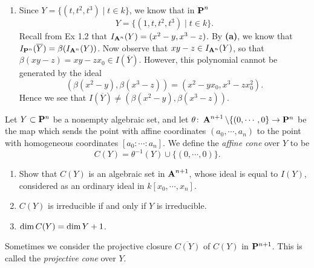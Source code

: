 \documentclass[10pt]{amsart}
\begin{document}
\begin{solution}
\begin{luke}
\begin{enumerate}
            \item Since $Y = \{(t, t^2, t^3) \mid t \in k\}$, we know that in $\pp^n$
            \[
                Y = \{ (1, t, t^2, t^3) \mid t \in k \}.
            \]
            Recall from Ex 1.2 that $I_{\aa^n}(Y) = (x^2 - y, x^3 - z)$. 
            By \textbf{(a)}, we know that $I_{\pp^n}(\overline{Y}) = \beta(I_{\aa^n}(Y))$.
            Now observe that $xy - z \in I_{\aa^n}(Y)$, so that $\beta(xy-z) = xy - zx_0 \in I(\overline{Y})$. 
            However, this polynomial cannot be generated by the ideal 
            \[
                (\beta(x^2 - y), \beta(x^3 - z)) = (x^2 - yx_0, x^3 - zx_0^2).  
            \]
            Hence we see that $I(\overline{Y}) \ne (\beta(x^2 - y), \beta(x^3 - z))$. 

        \end{enumerate}
    \end{luke}
\end{solution}

\begin{exercise}[2.10]
    Let $Y \subset \bbP^n$ be a nonempty algebraic set, and let $\theta\colon
    \aa^{n+1} \setminus \{(0,\cdots,0\} \to \bbP^n$ be the map which sends the
    point with affine coordinates $(a_0, \cdots, a_n)$ to the point with
    homogeneous coordinates $[a_0 :\cdots: a_n]$. We define the \emph{affine cone}
    over $Y$ to be $$C(Y) = \theta^{-1}(Y) \cup \{(0,\cdots, 0)\}.$$ 
    \begin{enumerate}
        \item Show that $C(Y)$ is an algebraic set in $\aa^{n+1}$, whose ideal is equal to $I(Y)$, considered as an ordinary ideal in $k[x_0, \cdots, x_n]$. 
        \item $C(Y)$ is irreducible if and only if $Y$ is irreducible. 
        \item $\Dim C(Y) = \Dim Y +1$.
    \end{enumerate}
    Sometimes we consider the projective closure $\overline{C(Y)}$ of $C(Y)$ in
    $\bbP^{n+1}$. This is called the \emph{projective cone} over $Y$.
\end{exercise}
\end{document}
